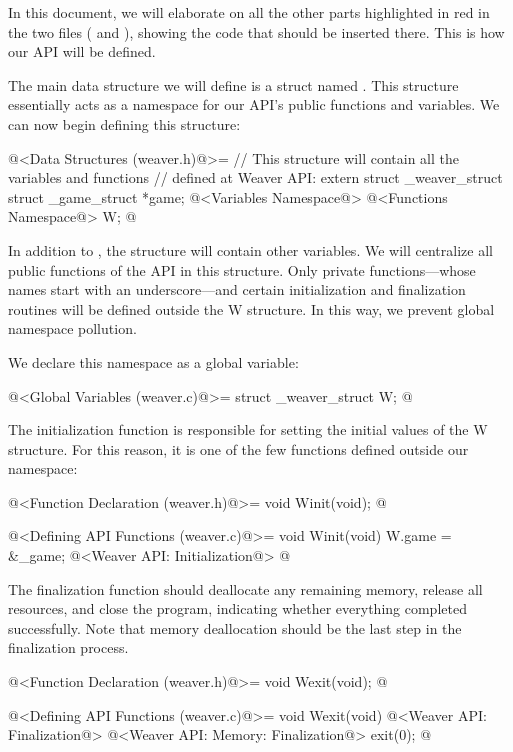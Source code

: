 In this document, we will elaborate on all the other parts highlighted
in red in the two files (
and ), showing the code that should be inserted
there. This is how our API will be defined.


The main data structure we will define is a struct
named . This structure essentially acts as a namespace
for our API’s public functions and variables. We can now begin
defining this structure:

\iniciocodigo
@<Data Structures (weaver.h)@>=
// This structure will contain all the variables and functions
// defined at Weaver API:
extern struct _weaver_struct{
  struct _game_struct *game;
  @<Variables Namespace@>
  @<Functions Namespace@>
} W;
@
\fimcodigo

In addition to , the structure will contain other
variables. We will centralize all public functions of the API in this
structure. Only private functions---whose names start with an
underscore---and certain initialization and finalization routines will
be defined outside the W structure. In this way, we prevent global
namespace pollution.

We declare this namespace as a global variable:

\iniciocodigo
@<Global Variables (weaver.c)@>=
struct _weaver_struct W;
@
\fimcodigo


The initialization function is responsible for setting the initial
values of the W structure. For this reason, it is one of the few
functions defined outside our namespace:

\iniciocodigo
@<Function Declaration (weaver.h)@>=
void Winit(void);
@
\fimcodigo

\iniciocodigo
@<Defining API Functions (weaver.c)@>=
void Winit(void){
  W.game = &_game;
  @<Weaver API: Initialization@>
}
@
\fimcodigo

The finalization function should deallocate any remaining memory,
release all resources, and close the program, indicating whether
everything completed successfully. Note that memory deallocation
should be the last step in the finalization process.

\iniciocodigo
@<Function Declaration (weaver.h)@>=
void Wexit(void);
@
\fimcodigo

\iniciocodigo
@<Defining API Functions (weaver.c)@>=
void Wexit(void){
  @<Weaver API: Finalization@>
  @<Weaver API: Memory: Finalization@>
  exit(0);
}
@
\fimcodigo

